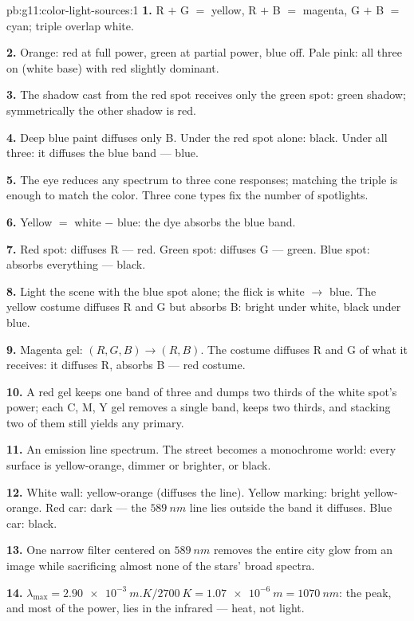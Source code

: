 \begin{solution}{pb:g11:color-light-sources:1}
\textbf{1.} R $+$ G $=$ yellow, R $+$ B $=$ magenta, G $+$ B $=$ cyan;
triple overlap white.

\textbf{2.} Orange: red at full power, green at partial power, blue
off. Pale pink: all three on (white base) with red slightly dominant.

\textbf{3.} The shadow cast from the red spot receives only the green
spot: green shadow; symmetrically the other shadow is red.

\textbf{4.} Deep blue paint diffuses only B. Under the red spot alone:
black. Under all three: it diffuses the blue band --- blue.

\textbf{5.} The eye reduces any spectrum to three cone responses;
matching the triple is enough to match the color. Three cone types fix
the number of spotlights.

\textbf{6.} Yellow $=$ white $-$ blue: the dye absorbs the blue band.

\textbf{7.} Red spot: diffuses R --- red. Green spot: diffuses G ---
green. Blue spot: absorbs everything --- black.

\textbf{8.} Light the scene with the blue spot alone; the flick is
white $\to$ blue. The yellow costume diffuses R and G but absorbs B:
bright under white, black under blue.

\textbf{9.} Magenta gel: $(R, G, B) \to (R, B)$. The costume diffuses
R and G of what it receives: it diffuses R, absorbs B --- red costume.

\textbf{10.} A red gel keeps one band of three and dumps two thirds of
the white spot's power; each C, M, Y gel removes a single band, keeps
two thirds, and stacking two of them still yields any primary.

\textbf{11.} An emission line spectrum. The street becomes a monochrome
world: every surface is yellow-orange, dimmer or brighter, or black.

\textbf{12.} White wall: yellow-orange (diffuses the line). Yellow
marking: bright yellow-orange. Red car: dark --- the $\qty{589}{nm}$
line lies outside the band it diffuses. Blue car: black.

\textbf{13.} One narrow filter centered on $\qty{589}{nm}$ removes the
entire city glow from an image while sacrificing almost none of the
stars' broad spectra.

\textbf{14.} $\lambda_{\max} = \qty{2.90e-3}{m.K}/\qty{2700}{K} =
\qty{1.07e-6}{m} = \qty{1070}{nm}$: the peak, and most of the power,
lies in the infrared --- heat, not light.


\end{solution}
